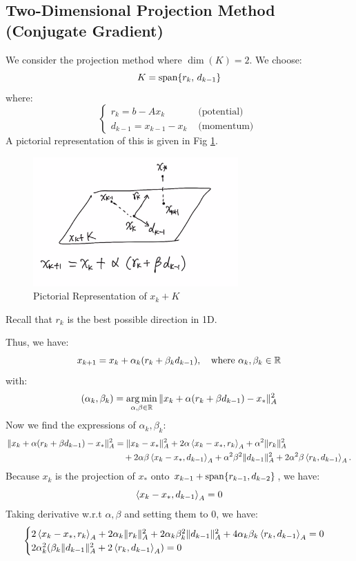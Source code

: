 \documentclass[../main/main.tex]{subfiles}
\begin{document}
\subsection{Two-Dimensional Projection Method (Conjugate Gradient)}
We consider the projection method where $\dim(K)=2$. We choose: \[
  K=\operatorname{span} \{r_{k},\, d_{k-1}\}
\] where: \[
\begin{cases}
  r_{k} = b-Ax_{k} &\text{ (potential) }\\
  d_{k-1} = x_{k-1}-x_{k} &\text{ (momentum) }
\end{cases}
\]
A pictorial representation of this is given in Fig \ref{fig:3-9-proj}.
\begin{figure}[htpb]
  \centering
  \includegraphics[width=0.7\textwidth]{../images/3-9-proj}
  \caption{Pictorial Representation of $x_{k}+K$}
  \label{fig:3-9-proj}
\end{figure}
\begin{remark}
Recall that $r_{k}$ is the best possible direction in 1D.
\end{remark}
Thus, we have: \[
  x_{k+1} = x_{k} + \alpha_{k}  (r_{k}+\beta_{k} d_{k-1}), \quad  \text{where }\alpha _{k},\beta _{k} \in \mathbb{R}
\] with: \[
  (\alpha_{k},\beta_{k}) = \operatorname*{arg\,min}_{\alpha ,\beta\in \mathbb{R} } \|x_{k}+\alpha (r_{k}+\beta d_{k-1})-x_{*}\|^2_{A}
\]
Now we find the expressions of $\alpha _{k}, \beta _{k}$: \begin{align*}
                                                            \|x_{k}+\alpha (r_{k}+\beta d_{k-1})-x_{*}\|^2_{A} &=\|x_{k}-x_{*}\|^2_{A} + 2\alpha \left\langle{x_{k}-x_{*}},{r_{k}}\right\rangle_{A}+\alpha ^2 \|r_{k}\|^2_{A} \\
                                                            &\quad  + 2\alpha \beta \left\langle{x_{k}-x_{*}},{d_{k-1}}\right\rangle_{A}+\alpha ^2\beta ^2\|d_{k-1}\|_{A}^2 + 2\alpha ^2\beta \left\langle{r_{k}},{d_{k-1}}\right\rangle_{A} .\end{align*}
                                                          Because $x_{k}$ is the projection of $x_{*}$ onto $x_{k-1}+\operatorname{span} \{r_{k-1},d_{k-2}\}$, we have: \[
                                                            \left\langle{x_{k}-x_{*}},{d_{k-1}}\right\rangle_{A} = 0\]Taking derivative w.r.t $\alpha,\beta $ and setting them to 0, we have: \[
\begin{cases}

  2\left\langle{x_{k}-x_{*}},{r_{k}}\right\rangle_{A}+2\alpha _{k}\|r_{k}\|^2_{A}+2\alpha _{k}\beta _{k}^2 \|d_{k-1}\|^2_{A}+4 \alpha _{k}\beta _{k}\left\langle{r_{k}},{d_{k-1}}\right\rangle_{A} = 0\\
  2\alpha _{k}^2 (\beta_{k}\|d_{k-1}\|_{A}^2 +2\left\langle{r_{k}},{d_{k-1}}\right\rangle_{A}) = 0
\end{cases}
\]
\end{document}
